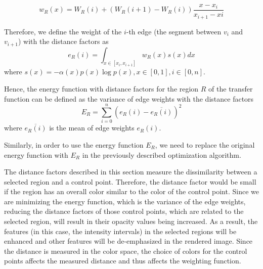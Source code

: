 \[ w_{R}(x)=W_{R}(i) + (W_{R}(i+1)-W_{R}(i))\frac{x-x_{i}}{x_{i+1}-x{i}} \]

Therefore, we define the weight of the $ i $-th edge (the segment between $ v_{i} $ and $ v_{i+1} $) with the distance factors as
\[
e_{R}(i)=\int_{x \in [x_{i}, x_{i+1}]} w_{R}(x)s(x) dx
\]
where $ s(x)=-\alpha(x)p(x) \log p(x), x \in [0,1], i \in [0,n]$.

Hence, the energy function with distance factors for the region $ R $ of the transfer function can be defined as the variance of edge weights with the distance factors
\[
E_{R}=\sum_{i=0}^{n}(e_{R}(i)-\overline{e_{R}(i)})^{2}
\]
where $ \overline{e_{R}(i)} $ is the mean of edge weights $e_{R}(i)$.


Similarly, in order to use the energy function $ E_{R} $, we need to replace the original energy function with $ E_{R} $ in the previously described optimization algorithm.


The distance factors described in this section measure the dissimilarity between a selected region and a control point. Therefore, the distance factor would be small if the region has an overall color similar to the color of the control point.
Since we are minimizing the energy function, which is the variance of the edge weights, reducing the distance factors of those control points, which are related to the selected region, will result in their opacity values being increased. As a result, the features (in this case, the intensity intervals) in the selected regions will be enhanced and other features will be de-emphasized in the rendered image.
Since the distance is measured in the color space, the choice of colors for the control points affects the measured distance and thus affects the weighting function.


